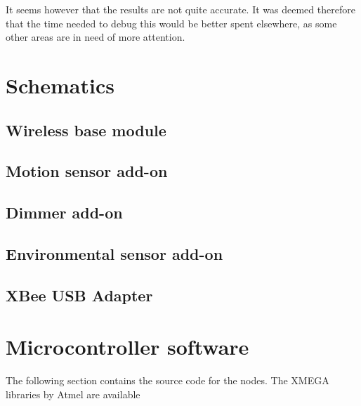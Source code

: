 It seems however that the results are not quite accurate. It was deemed
therefore that the time needed to debug this would be better spent elsewhere, as
some other areas are in need of more attention.

\pagebreak
\section{Schematics}

\subsection{Wireless base module}
\label{sub:sch-wirelessmodule}


\subsection{Motion sensor add-on}
\label{sub:sch-motionboard}


\subsection{Dimmer add-on}
\label{sub:sch-dimmerboard}


\subsection{Environmental sensor add-on}
\label{sub:sch-sensorsboard}


\subsection{XBee USB Adapter}
\label{sub:sch-usbboard}


\pagebreak
\section{Microcontroller software}
The following section contains the source code for the nodes. The XMEGA
libraries by Atmel are available %


